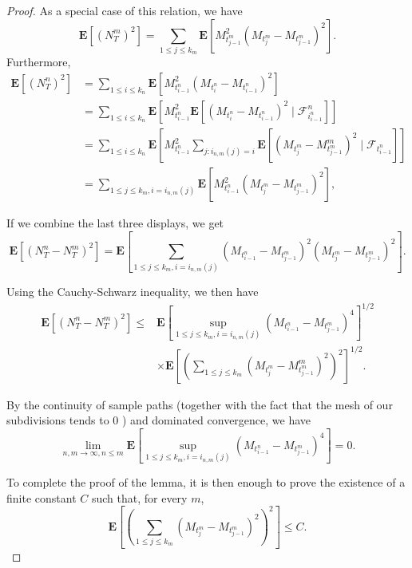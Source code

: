 \documentclass[twoside, 12pt]{book}
\numberwithin{equation}{chapter}
\def\bE{{\mathbf E}}
\def\leq{\leqslant}
\begin{document}
\begin{proof}
		As a special case of this relation, we have
		$$
		\bE\left[\left(N_T^m\right)^2\right]=\sum_{1 \leq j \leq k_m} \bE\left[M_{t_{j-1}^m}^2\left(M_{t_j^m}-M_{t_{j-1}^m}\right)^2\right] .
		$$
		Furthermore,
		\begin{equation*}
			\begin{aligned}
				\bE\left[\left(N_T^n\right)^2\right] & =\sum_{1 \leq i \leq k_n} \bE\left[M_{t_{i-1}^n}^2\left(M_{t_i^n}-M_{t_{i-1}^n}\right)^2\right] \\
				& =\sum_{1 \leq i \leq k_n} \bE\left[M_{t_{i-1}^n}^2 \bE\left[\left(M_{t_i^n}-M_{t_{i-1}^n}\right)^2 \mid \mathscr{F}_{i_{i-1}^n}^n\right]\right] \\
				& =\sum_{1 \leq i \leq k_n} \bE\left[M_{t_{i-1}^n}^2 \sum_{j: i_{n, m}(j)=i} \bE\left[\left(M_{t_j^m}-M_{t_{j-1}^m}^m\right)^2 \mid \mathscr{F}_{t_{i-1}^n}\right]\right] \\
				& =\sum_{1 \leq j \leq k_m, i=i_{n, m}(j)} \bE\left[M_{t_{i-1}^n}^2\left(M_{t_j^m}-M_{t_{j-1}^m}\right)^2\right],
			\end{aligned}
		\end{equation*}
		
		If we combine the last three displays, we get
		$$
		\bE\left[\left(N_T^n-N_T^m\right)^2\right]=\bE\left[\sum_{1 \leq j \leq k_m, i=i_{n, m}(j)}\left(M_{t_{i-1}^n}-M_{t_{j-1}^m}\right)^2\left(M_{t_j^m}-M_{t_{j-1}^m}\right)^2\right] .
		$$
		
		Using the Cauchy-Schwarz inequality, we then have
		$$
		\begin{aligned}
			\bE\left[\left(N_T^n-N_T^m\right)^2\right] \leq & \bE\left[\sup _{1 \leq j \leq k_m, i=i_{n, m}(j)}\left(M_{t_{i-1}^n}-M_{t_{j-1}^m}\right)^4\right]^{1 / 2} \\
			& \times \bE\left[\left(\sum_{1 \leq j \leq k_m}\left(M_{t_j^m}-M_{t_{j-1}^m}^m\right)^2\right)^2\right]^{1 / 2} .
		\end{aligned}
		$$
		
		By the continuity of sample paths (together with the fact that the mesh of our subdivisions tends to 0 ) and dominated convergence, we have
		$$
		\lim _{n, m \rightarrow \infty, n \leq m} \bE\left[\sup _{1 \leq j \leq k_m, i=i_{n, m}(j)}\left(M_{t_{i-1}^n}-M_{t_{j-1}^m}\right)^4\right]=0 .
		$$
		
		To complete the proof of the lemma, it is then enough to prove the existence of a finite constant $C$ such that, for every $m$,
		$$
		\bE\left[\left(\sum_{1 \leq j \leq k_m}\left(M_{t_j^m}-M_{t_{j-1}^m}\right)^2\right)^2\right] \leq C .
		$$
		

\end{proof}
\end{document}
